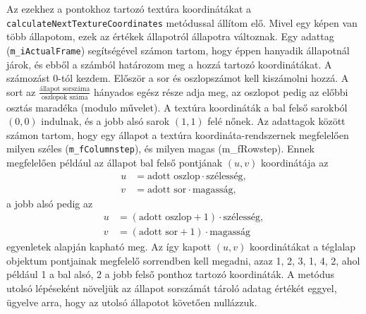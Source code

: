Az ezekhez a pontokhoz tartozó textúra koordinátákat a \texttt{calculateNextTextureCoordinates} metódussal állítom elő. Mivel egy képen van több állapotom, ezek az értékek állapotról állapotra változnak. Egy adattag (\texttt{m\_iActualFrame}) segítségével számon tartom, hogy éppen hanyadik állapotnál járok, és ebből a számból határozom meg a hozzá tartozó koordinátákat. A számozást 0-tól kezdem. Először a sor és oszlopszámot kell kiszámolni hozzá. A sort az $\frac{\text{állapot sorszáma}}{\text{oszlopok száma}}$ hányados egész része adja meg, az oszlopot pedig az előbbi osztás maradéka (modulo művelet). A textúra koordináták a bal felső sarokból $(0, 0)$ indulnak, és a jobb alsó sarok $(1, 1)$ felé nőnek. Az adattagok között számon tartom, hogy egy állapot a textúra koordináta-rendszernek megfelelően milyen széles (\texttt{m\_fColumnstep}), és milyen magas (m\_fRowstep). Ennek megfelelően például az állapot bal felső pontjának $(u, v)$ koordinátája az 
\begin{align*}
u &= \text{adott oszlop} \cdot \text{szélesség}, \\
v &= \text{adott sor} \cdot \text{magasság}, 
\end{align*}
a jobb alsó pedig az  
\begin{align*}
u &= (\text{adott oszlop} + 1) \cdot \text{szélesség}, \\
v &= (\text{adott sor} + 1) \cdot \text{magasság} 
\end{align*}
egyenletek alapján kapható meg. Az így kapott $(u, v)$ koordinátákat a téglalap objektum pontjainak megfelelő sorrendben kell megadni, azaz 1, 2, 3, 1, 4, 2, ahol például 1 a bal alsó, 2 a jobb felső ponthoz tartozó koordináták. A metódus utolsó lépéseként növeljük az állapot sorszámát tároló adatag értékét eggyel, ügyelve arra, hogy az utolsó állapotot követően nullázzuk.

